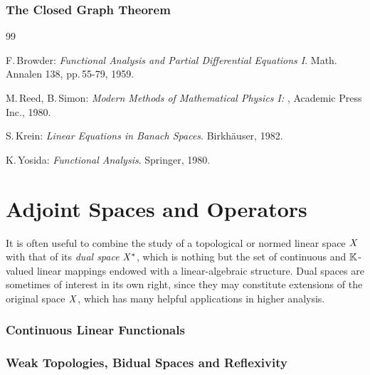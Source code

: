 \documentclass[11pt,twoside]{article}
\begin{document}
\section{The Closed Graph Theorem}

\vspace{5mm}
\begin{thebibliography}{99}
\begin{small}

 F.\,Browder:
\textit{Functional Analysis and Partial Differential Equations I}.
Math. Annalen 138, pp.\,55-79, 1959.

 M.\,Reed, B.\,Simon:
\textit{Modern Methods of Mathematical Physics I: {\FA}},
Academic Press Inc., 1980.

 S.\,Krein:
\textit{Linear Equations in Banach Spaces}.
Birk\-h\"{a}user, 1982.

 K.\,Yosida:
\textit{Functional Analysis}.
Springer, 1980.

\end{small}
\end{thebibliography}

\newpage
\thispagestyle{empty}
\part{Adjoint Spaces and Operators}                                            %
It is often useful to combine the study of a topological or normed linear space
$\mathit{X}$ with that of its \textit{dual space} $\mathit{X}^*$,
which is nothing but the set of continuous and ${\mathbb{K}}$-valued linear mappings
endowed with a linear-algebraic structure.
Dual spaces are sometimes of interest in its own right,
since they may constitute extensions of the original space $\mathit{X}$,
which has many helpful applications in higher analysis.

\section{Continuous Linear Functionals}
\section{Weak Topologies, Bidual Spaces and Reflexivity}
\end{document}
